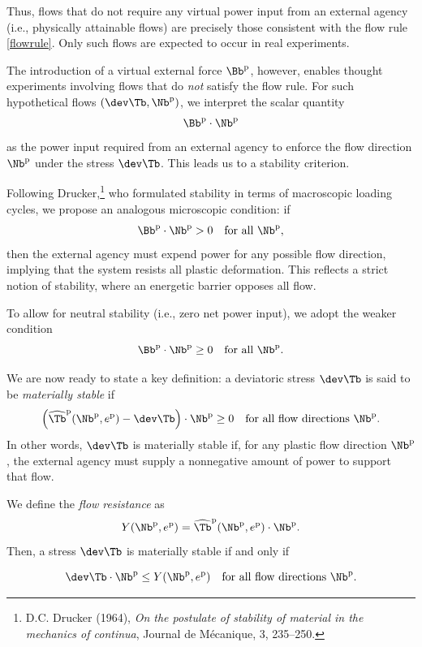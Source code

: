 Thus, flows that do not require any virtual power input from an external agency (i.e., physically attainable flows) are precisely those consistent with the flow rule \eqref{flowrule}. Only such flows are expected to occur in real experiments.

The introduction of a virtual external force $\Bb^{\rm p}$, however, enables thought experiments involving flows that do \emph{not} satisfy the flow rule. For such hypothetical flows $(\dev\Tb, \Nb^{\rm p})$, we interpret the scalar quantity
\[
\Bb^{\rm p} \cdot \Nb^{\rm p}
\]
as the power input required from an external agency to enforce the flow direction $\Nb^{\rm p}$ under the stress $\dev\Tb$. This leads us to a stability criterion.

Following Drucker,\footnote{D.C. Drucker (1964), \emph{On the postulate of stability of material in the mechanics of continua}, Journal de Mécanique, 3, 235–250.} who formulated stability in terms of macroscopic loading cycles, we propose an analogous microscopic condition: if
\begin{equation}\label{stab}
	\Bb^{\rm p} \cdot \Nb^{\rm p} > 0 \quad \text{for all } \Nb^{\rm p},
\end{equation}
then the external agency must expend power for any possible flow direction, implying that the system resists all plastic deformation. This reflects a strict notion of stability, where an energetic barrier opposes all flow.

To allow for neutral stability (i.e., zero net power input), we adopt the weaker condition
\begin{equation}\label{stab1}
	\Bb^{\rm p} \cdot \Nb^{\rm p} \geq 0 \quad \text{for all } \Nb^{\rm p}.
\end{equation}

We are now ready to state a key definition: a deviatoric stress $\dev\Tb$ is said to be \emph{materially stable} if
\begin{equation}
	\left( \widehat{\Tb}^{\rm p}(\Nb^{\rm p}, e^{\rm p}) - \dev\Tb \right) \cdot \Nb^{\rm p} \geq 0 \quad \text{for all flow directions } \Nb^{\rm p}.
\end{equation}
In other words, $\dev\Tb$ is materially stable if, for any plastic flow direction $\Nb^{\rm p}$, the external agency must supply a nonnegative amount of power to support that flow.

We define the \emph{flow resistance} as
\begin{equation}
	Y(\Nb^{\rm p}, e^{\rm p}) = \widehat{\Tb}^{\rm p}(\Nb^{\rm p}, e^{\rm p}) \cdot \Nb^{\rm p}.
\end{equation}
Then, a stress $\dev\Tb$ is materially stable if and only if
\begin{definition}
	\begin{equation}
	\dev\Tb \cdot \Nb^{\rm p} \leq Y(\Nb^{\rm p}, e^{\rm p}) \quad \text{for all flow directions } \Nb^{\rm p}.
\end{equation}
\end{definition}

